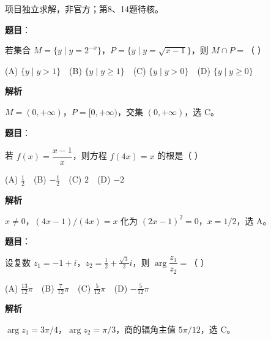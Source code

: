 

\begin{gktip}
项目独立求解，非官方；第8、14题待核。
\end{gktip}

\begin{answer}

\textbf{题目}：

若集合 $M=\{y\mid y=2^{-x}\}$，$P=\{y\mid y=\sqrt{x-1}\}$，则 $M\cap P=$（ ）

   (A) $\{y\mid y>1\}$　(B) $\{y\mid y\ge1\}$　(C) $\{y\mid y>0\}$　(D) $\{y\mid y\ge0\}$

\textbf{解析}

$M=(0,+\infty)$，$P=[0,+\infty)$，交集 $(0,+\infty)$，选 C。


\end{answer}
\begin{answer}

\textbf{题目}：

若 $f(x)=\dfrac{x-1}{x}$，则方程 $f(4x)=x$ 的根是（ ）

   (A) $\frac12$　(B) $-\frac12$　(C) $2$　(D) $-2$

\textbf{解析}

$x\ne0$，$(4x-1)/(4x)=x$ 化为 $(2x-1)^2=0$，$x=1/2$，选 A。


\end{answer}
\begin{answer}

\textbf{题目}：

设复数 $z_1=-1+i$，$z_2=\frac12+\frac{\sqrt3}{2}i$，则 $\arg\dfrac{z_1}{z_2}=$（ ）

   (A) $\frac{13}{12}\pi$　(B) $\frac7{12}\pi$　(C) $\frac5{12}\pi$　(D) $-\frac5{12}\pi$

\textbf{解析}

$\arg z_1=3\pi/4$，$\arg z_2=\pi/3$，商的辐角主值 $5\pi/12$，选 C。


\end{answer}

